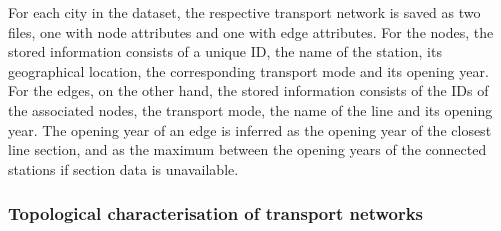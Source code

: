 For each city in the dataset, the respective transport network is saved as two files, one with node attributes and one with edge attributes. For the nodes, the stored information consists of a unique ID, the name of the station, its geographical location, the corresponding transport mode and its opening year. For the edges, on the other hand, the stored information consists of the IDs of the associated nodes, the transport mode, the name of the line and its opening year. The opening year of an edge is inferred as the opening year of the closest line section, and as the maximum between the opening years of the connected stations if section data is unavailable. 



\subsubsection*{Topological characterisation of transport networks}






\newpage


